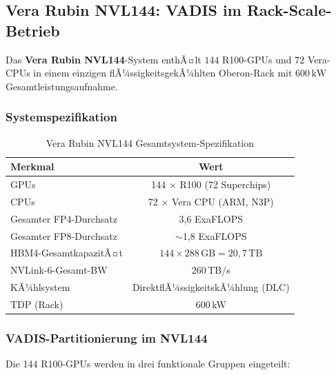 ﻿\documentclass[12pt,a4paper]{article}
\begin{document}
\subsection{Vera Rubin NVL144: VADIS im Rack-Scale-Betrieb}
\label{sub:nvl144}

Das \textbf{Vera Rubin NVL144}-System enthÃ¤lt
$144$ R100-GPUs und $72$ Vera-CPUs in einem einzigen
flÃ¼ssigkeitsgekÃ¼hlten Oberon-Rack mit $600\,\text{kW}$
Gesamtleistungsaufnahme.

\subsubsection{Systemspezifikation}

\begin{table}[ht]
\centering
\small
\caption{Vera Rubin NVL144 Gesamtsystem-Spezifikation}
\label{tab:nvl144}
\begin{tabular}{@{}lc@{}}
\toprule
\textbf{Merkmal} & \textbf{Wert} \\
\midrule
GPUs & 144 $\times$ R100 (72 Superchips) \\
CPUs & 72 $\times$ Vera CPU (ARM, N3P) \\
Gesamter FP4-Durchsatz & 3,6 ExaFLOPS \\
Gesamter FP8-Durchsatz & $\sim$1,8 ExaFLOPS \\
HBM4-GesamtkapazitÃ¤t & $144 \times 288\,\text{GB} = 20{,}7\,\text{TB}$ \\
NVLink-6-Gesamt-BW & 260\,TB/s \\
KÃ¼hlsystem & DirektflÃ¼ssigkeitskÃ¼hlung (DLC) \\
TDP (Rack) & 600\,kW \\
\bottomrule
\end{tabular}
\end{table}

\subsubsection{VADIS-Partitionierung im NVL144}

Die 144 R100-GPUs werden in drei funktionale Gruppen eingeteilt:
\end{document}
